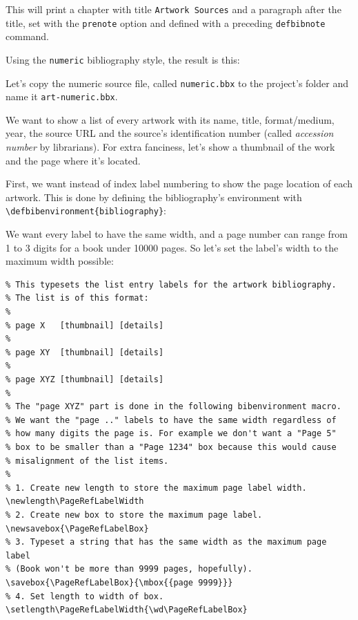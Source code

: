 \documentclass[12pt,a4,oneside,usenames,dvipsnames]{book}
\begin{document}
This will print a chapter with title \texttt{Artwork Sources} and a paragraph
after the title, set with the \texttt{prenote} option and defined with a
preceding \texttt{defbibnote} command.

Using the \texttt{numeric} bibliography style, the result is this:

\begin{figure}
{\centering%
%
\skelcaption[width=0.2\textwidth,lines=1]{}}
\end{figure}

Let's copy the numeric source file, called \texttt{numeric.bbx} to the
project's folder and name it \texttt{art-numeric.bbx}.

We want to show a list of every artwork with its name, title,
format/medium, year, the source URL and the source's identification
number (called \emph{accession number} by librarians). For extra
fanciness, let's show a thumbnail of the work and the page where it's
located.

First, we want instead of index label numbering to show the page
location of each artwork. This is done by defining the bibliography's
environment with
\texttt{\textbackslash{}defbibenvironment\{bibliography\}}:

\begin{figure}
{\centering%
%
\skelcaption[width=0.2\textwidth,lines=1]{}}
\end{figure}

We want every label to have the same width, and a page number can range
from 1 to 3 digits for a book under 10\thinspace{}000 pages. So let's
set the label's width to the maximum width possible:

\begin{verbatim}
% This typesets the list entry labels for the artwork bibliography.
% The list is of this format:
%
% page X   [thumbnail] [details]
%
% page XY  [thumbnail] [details]
%
% page XYZ [thumbnail] [details]
%
% The "page XYZ" part is done in the following bibenvironment macro.
% We want the "page .." labels to have the same width regardless of
% how many digits the page is. For example we don't want a "Page 5"
% box to be smaller than a "Page 1234" box because this would cause
% misalignment of the list items.
%
% 1. Create new length to store the maximum page label width.
\newlength\PageRefLabelWidth
% 2. Create new box to store the maximum page label.
\newsavebox{\PageRefLabelBox}
% 3. Typeset a string that has the same width as the maximum page label
% (Book won't be more than 9999 pages, hopefully).
\savebox{\PageRefLabelBox}{\mbox{{page 9999}}}
% 4. Set length to width of box.
\setlength\PageRefLabelWidth{\wd\PageRefLabelBox}
\end{verbatim}
\end{document}
